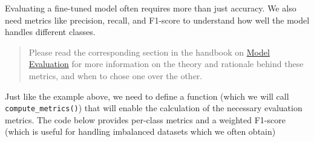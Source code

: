 \documentclass[
  letterpaper,
  DIV=11,
  numbers=noendperiod]{scrreprt}
\begin{document}
Evaluating a fine-tuned model often requires more than just accuracy. We
also need metrics like precision, recall, and F1-score to understand how
well the model handles different classes.

\begin{quote}
Please read the corresponding section in the handbook on
\href{./model_evaluation.qmd}{Model Evaluation} for more information on
the theory and rationale behind these metrics, and when to chose one
over the other.
\end{quote}

Just like the example above, we need to define a function (which we will
call \texttt{compute\_metrics()}) that will enable the calculation of
the necessary evaluation metrics. The code below provides per-class
metrics and a weighted F1-score (which is useful for handling imbalanced
datasets which we often obtain)
\end{document}
